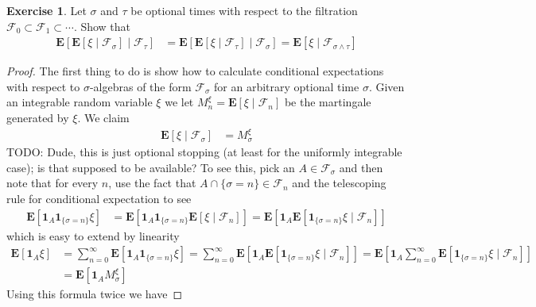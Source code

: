 \documentclass{amsbook}
\theoremstyle{definition}
\newtheorem{xca}{Exercise}
\theoremstyle{remark}
\newcommand{\expectation}[1]{\textbf{E}\left[#1\right]}
\newcommand{\cexpectationlong}[2]{\textbf{E}\left[ #2 \mid #1 \right]}
\newcommand{\characteristic}[1]{\textbf{1}_{#1}}
\begin{document}
\begin{xca}Let $\sigma$ and $\tau$ be optional times with respect to
  the filtration $\mathcal{F}_0 \subset \mathcal{F}_1 \subset
  \cdots$.  Show that 
\begin{align*}
\cexpectationlong
{\mathcal{F}_\tau}{\cexpectationlong{\mathcal{F}_\sigma}{\xi}} &=
\cexpectationlong
{\mathcal{F}_\sigma}{\cexpectationlong{\mathcal{F}_\tau}{\xi}} = \cexpectationlong
{\mathcal{F}_{\sigma \wedge \tau}}{\xi}
\end{align*}
\end{xca}
\begin{proof}
The first thing to do is show how to calculate conditional
expectations with respect to $\sigma$-algebras of the form
$\mathcal{F}_\sigma$ for an arbitrary optional time $\sigma$.  Given
an integrable random variable $\xi$ we let $M^\xi_n =
\cexpectationlong{\mathcal{F}_n}{\xi}$ be the martingale generated by
$\xi$.  We claim
\begin{align*}
\cexpectationlong{\mathcal{F}_\sigma}{\xi} &= M^\xi_\sigma
\end{align*}
TODO:  Dude, this is just optional stopping (at least for the
uniformly integrable case); is that supposed to be available?
To see this, pick an $A \in \mathcal{F}_\sigma$ and then note that for
every $n$, use the fact that $A \cap \lbrace \sigma = n \rbrace \in
\mathcal{F}_n$ and the telescoping rule for conditional expectation to see
\begin{align*}
\expectation{\characteristic{A} \characteristic{\lbrace \sigma = n
    \rbrace } \xi} &= 
\expectation{\characteristic{A} \characteristic{\lbrace \sigma = n
    \rbrace } \cexpectationlong{\mathcal{F}_n}{\xi} } = 
\expectation{\characteristic{A} \cexpectationlong{\mathcal{F}_n}{\characteristic{\lbrace \sigma = n
    \rbrace } \xi} } 
\end{align*}
which is easy to extend by linearity 
\begin{align*}
\expectation{\characteristic{A} \xi} &= \sum_{n=0}^\infty \expectation{\characteristic{A} \characteristic{\lbrace \sigma = n
    \rbrace } \xi} = \sum_{n=0}^\infty \expectation{\characteristic{A} \cexpectationlong{\mathcal{F}_n}{\characteristic{\lbrace \sigma = n
    \rbrace } \xi}} = \expectation{\characteristic{A}
  \sum_{n=0}^\infty \cexpectationlong{\mathcal{F}_n}{\characteristic{\lbrace \sigma = n
    \rbrace } \xi}} \\
&= \expectation{\characteristic{A} M^\xi_\sigma}
\end{align*}
Using this formula twice we have

\end{proof}
\end{document}
